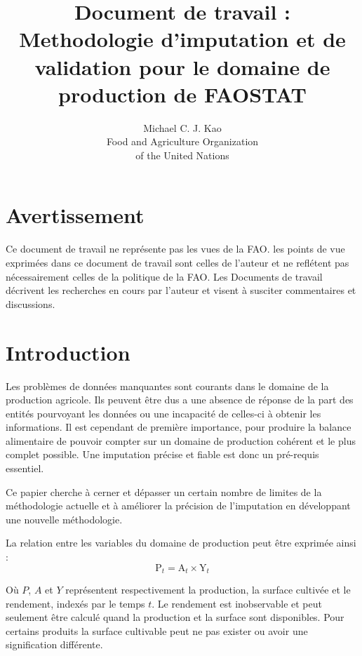 \documentclass[nojss]{jss}\usepackage{graphicx, color}
\title{\bf Document de travail : Methodologie d'imputation et de
  validation pour le domaine de production de FAOSTAT}
\author{Michael C. J. Kao\\ Food and Agriculture Organization \\ of
  the United Nations}
\begin{document}


\section*{Avertissement}
Ce document de travail ne repr\'{e}sente pas les vues de la FAO. les
points de vue exprim\'{e}es dans ce document de travail sont celles de
l'auteur et ne refl\'{e}tent pas nécessairement celles de la politique
de la FAO. Les Documents de travail d\'{e}crivent les recherches en
cours par l'auteur et visent \`{a} susciter commentaires et
discussions.


\section{Introduction}
Les probl\`{e}mes de donn\'{e}es manquantes sont courants dans le
domaine de la production agricole. Ils peuvent \^{e}tre dus a une
absence de r\'{e}ponse de la part des entit\'{e}s pourvoyant les
donn\'{e}es ou une incapacit\'{e} de celles-ci \`{a} obtenir les
informations.  Il est cependant de premi\`{e}re importance, pour
produire la balance alimentaire de pouvoir compter sur un domaine de
production coh\'{e}rent et le plus complet possible. Une imputation
pr\'{e}cise et fiable est donc un pr\'{e}-requis essentiel.

Ce papier cherche \`{a} cerner et d\'{e}passer un certain nombre de
limites de la m\'{e}thodologie actuelle et \`{a} am\'{e}liorer la
pr\'{e}cision de l'imputation en d\'{e}veloppant une nouvelle
m\'{e}thodologie.


La relation entre les variables du domaine de production peut \^{e}tre
exprim\'{e}e ainsi :
\begin{equation}
  \label{eq:identity}
  \text{P}_t = \text{A}_t \times \text{Y}_t
\end{equation}


O\`{u} $P$, $A$ et $Y$ repr\'{e}sentent respectivement la production, la
surface cultiv\'{e}e et le rendement, index\'{e}s par le temps $t$. Le
rendement est inobservable et peut seulement \^{e}tre calcul\'{e} quand la
production et la surface sont disponibles. Pour certains produits la
surface cultivable peut ne pas exister ou avoir une signification
diff\'{e}rente.
\end{document}
